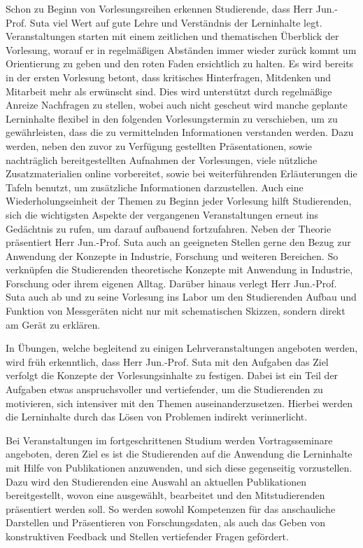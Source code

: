 \documentclass[foldmarks,rightdate,twoside,a4paper]{hhuletter}
\begin{document}
\begin{letter}
Schon zu Beginn von Vorlesungsreihen erkennen Studierende, dass Herr Jun.-Prof. Suta viel Wert auf gute Lehre und Verständnis der Lerninhalte legt. Veranstaltungen starten mit einem zeitlichen und thematischen Überblick der Vorlesung, worauf er in regelmäßigen Abständen immer wieder zurück kommt um Orientierung zu geben und den roten Faden ersichtlich zu halten. Es wird bereits in der ersten Vorlesung betont, dass kritisches Hinterfragen, Mitdenken und Mitarbeit mehr als erwünscht sind. Dies wird unterstützt durch regelmäßige Anreize Nachfragen zu stellen, wobei auch nicht gescheut wird manche geplante Lerninhalte flexibel in den folgenden Vorlesungstermin zu verschieben, um zu gewährleisten, dass die zu vermittelnden Informationen verstanden werden. Dazu werden, neben den zuvor zu Verfügung gestellten Präsentationen, sowie nachträglich bereitgestellten Aufnahmen der Vorlesungen, viele nützliche Zusatzmaterialien online vorbereitet, sowie bei weiterführenden Erläuterungen die Tafeln benutzt, um zusätzliche Informationen darzustellen. Auch eine Wiederholungseinheit der Themen zu Beginn jeder Vorlesung hilft Studierenden, sich die wichtigsten Aspekte der vergangenen Veranstaltungen erneut ins Gedächtnis zu rufen, um darauf aufbauend fortzufahren. Neben der Theorie präsentiert Herr Jun.-Prof. Suta auch an geeigneten Stellen gerne den Bezug zur Anwendung der Konzepte in Industrie, Forschung und weiteren Bereichen. So verknüpfen die Studierenden theoretische Konzepte mit Anwendung in Industrie, Forschung oder ihrem eigenen Alltag.
Darüber hinaus verlegt Herr Jun.-Prof. Suta auch ab und zu seine Vorlesung ins Labor um den Studierenden Aufbau und Funktion von Messgeräten nicht nur mit schematischen Skizzen, sondern direkt am Gerät zu erklären.

In Übungen, welche begleitend zu einigen Lehrveranstaltungen angeboten werden, wird früh erkenntlich, dass Herr Jun.-Prof. Suta mit den Aufgaben das Ziel verfolgt die Konzepte der Vorlesungsinhalte zu festigen. Dabei ist ein Teil der Aufgaben etwas anspruchsvoller und vertiefender, um die Studierenden zu motivieren, sich intensiver mit den Themen auseinanderzusetzen. Hierbei werden die Lerninhalte durch das Lösen von Problemen indirekt verinnerlicht.

Bei Veranstaltungen im fortgeschrittenen Studium werden Vortragsseminare angeboten, deren Ziel es ist die Studierenden auf die Anwendung die Lerninhalte mit Hilfe von Publikationen anzuwenden, und sich diese gegenseitig vorzustellen. Dazu wird den Studierenden eine Auswahl an aktuellen Publikationen bereitgestellt, wovon eine ausgewählt, bearbeitet und den Mitstudierenden präsentiert werden soll. So werden sowohl Kompetenzen für das anschauliche Darstellen und Präsentieren von Forschungsdaten, als auch das Geben von konstruktiven Feedback und Stellen vertiefender Fragen gefördert.


\end{letter}
\end{document}
